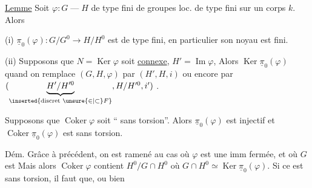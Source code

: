 

\uline{Lemme} Soit $\varphi:G\mathbin{\text{---}}H$  de type fini de groupes loc. de type fini sur un corps $k$. Alors

(i) $\underline{\pi}_0(\varphi):G/G^0\longrightarrow H/H^0$ est de type fini, en particulier son noyau est fini.


\deleted{[Si $N=\operatorname{Ker}\varphi$ est connexe, alors $\underline{\pi}_0(\varphi)$ est $\unsure{\simeq}$ une immersion fermée]}

(ii) Supposons que $N=\operatorname{Ker}\varphi$ soit \uline{connexe},  $H'=\operatorname{Im}\varphi$,  Alors $\operatorname{Ker}\underline{\pi}_0(\varphi)$
quand on remplace $(G,H,\varphi)$ par $(H',H,i)$ ou encore par $(\underbrace{H'/H'^0}_{\inserted{\text{discret }\unsure{\in|\subset}F}},H/H'^0,i')$ \unsure{\ldots}.

  Supposons  que $\operatorname{Coker}\varphi$ soit `` sans torsion''. Alors $\underline{\pi}_0(\varphi)$ est injectif et $\operatorname{Coker}\underline{\pi}_0(\varphi)$ est sans torsion.

Dém. Grâce à  précédent, on est ramené au cas où $\varphi$ est une imm fermée, et où $G$ est  Mais alors $\operatorname{Coker}\varphi$ contient $H^0/G\cap H^0$ où $G\cap H^0\simeq\operatorname{Ker}\underline{\pi}_0(\varphi)$. Si ce  est sans torsion, il faut que, ou bien


